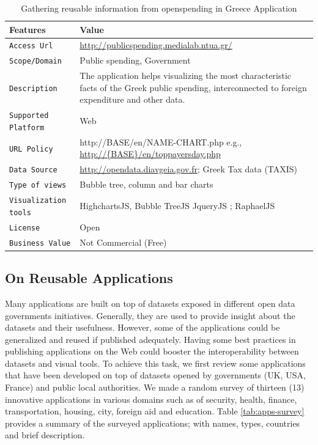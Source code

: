 \begin{table}[ht!b]
    \caption{Gathering reusable information from openspending in Greece Application} \label{tab:describeApps}
    \small
    \center
    \begin{tabularx}{\textwidth}{@{}lX@{}}
    \toprule
    \textbf{Features} & \textbf{Value}\\
    \toprule
    \texttt{Access Url }&	\url{http://publicspending.medialab.ntua.gr/}\\
    \midrule
    \texttt{Scope/Domain} &	Public spending, Government \\
    \midrule
    \texttt{Description} & The application helps visualizing the most characteristic facts of the Greek public spending, interconnected to foreign expenditure and other data. \\
    \midrule
    \texttt{Supported Platform} &	Web \\ 
    \midrule
    \texttt{URL Policy}   &  http://{BASE}/en/{NAME-CHART}.php e.g., \url{http://{BASE}/en/toppayersday.php} \\
    \midrule
    \texttt{Data Source}	& \url{http://opendata.diavgeia.gov.fr}; Greek Tax data (TAXIS) \\ 
    \midrule
\texttt{Type of views} & Bubble tree, column and bar charts \\ 
    \midrule
   \texttt{Visualization tools} &  HighchartsJS,  Bubble TreeJS JqueryJS ; RaphaelJS \\ 
   \midrule
  \texttt{License} & Open \\ 
    \midrule
\texttt{Business Value} & Not Commercial (Free) \\ 
    \bottomrule
  
    \end{tabularx}
    \end{table}

\subsection{On Reusable Applications} \label{sec:reusable}
Many applications are built on top of datasets exposed in different open data governments initiatives. Generally, they are used to provide insight about the datasets and their usefulness. However, some of the applications could be generalized and reused if published adequately. Having some best practices in publishing applications on the Web could booster the interoperability between datasets and visual tools. To achieve this task, we first review some applications that have been developed on top of datasets  opened by governments (UK, USA, France) and public local authorities. We made a random survey of thirteen (13) innovative applications \cite{deliverable2012a} in various domains such as of security, health, finance, transportation, housing, city, foreign aid and education. Table \ref{tab:apps-survey} provides a summary of the surveyed applications; with names, types, countries and brief description.
  
